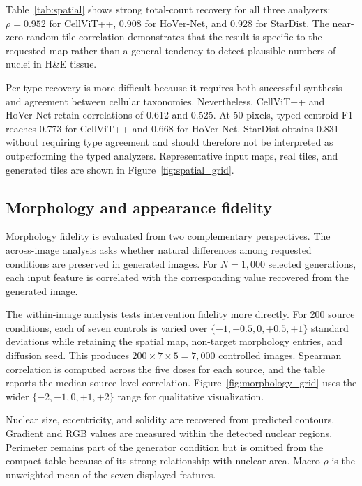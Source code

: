 Table~\ref{tab:spatial} shows strong total-count recovery for all three analyzers: $\rho=0.952$ for CellViT++, 0.908 for HoVer-Net, and 0.928 for StarDist. The near-zero random-tile correlation demonstrates that the result is specific to the requested map rather than a general tendency to detect plausible numbers of nuclei in H\&E tissue.

Per-type recovery is more difficult because it requires both successful synthesis and agreement between cellular taxonomies. Nevertheless, CellViT++ and HoVer-Net retain correlations of 0.612 and 0.525. At 50 pixels, typed centroid F1 reaches 0.773 for CellViT++ and 0.668 for HoVer-Net. StarDist obtains 0.831 without requiring type agreement and should therefore not be interpreted as outperforming the typed analyzers. Representative input maps, real tiles, and generated tiles are shown in Figure~\ref{fig:spatial_grid}.

\subsection{Morphology and appearance fidelity}
\label{sec:morphology-fidelity-experiment}

Morphology fidelity is evaluated from two complementary perspectives. The across-image analysis asks whether natural differences among requested conditions are preserved in generated images. For $N=1{,}000$ selected generations, each input feature is correlated with the corresponding value recovered from the generated image.

The within-image analysis tests intervention fidelity more directly. For 200 source conditions, each of seven controls is varied over
$\{-1,-0.5,0,+0.5,+1\}$ standard deviations while retaining the spatial map, non-target morphology entries, and diffusion seed. This produces
$200\times7\times5=7{,}000$ controlled images. Spearman correlation is computed across the five doses for each source, and the table reports the median source-level correlation. Figure~\ref{fig:morphology_grid} uses the wider $\{-2,-1,0,+1,+2\}$ range for qualitative visualization.

Nuclear size, eccentricity, and solidity are recovered from predicted contours. Gradient and RGB values are measured within the detected nuclear regions. Perimeter remains part of the generator condition but is omitted from the compact table because of its strong relationship with nuclear area. Macro $\rho$ is the unweighted mean of the seven displayed features.

